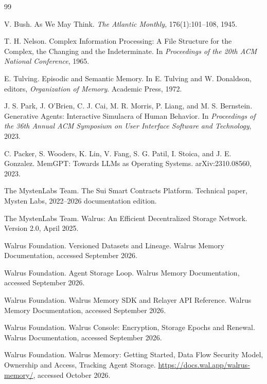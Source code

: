 \documentclass[11pt]{article}
\begin{document}
\begin{thebibliography}{99}

V. Bush.
\newblock As We May Think.
\newblock \emph{The Atlantic Monthly}, 176(1):101--108, 1945.

T. H. Nelson.
\newblock Complex Information Processing: A File Structure for the Complex, the Changing and the Indeterminate.
\newblock In \emph{Proceedings of the 20th ACM National Conference}, 1965.

E. Tulving.
\newblock Episodic and Semantic Memory.
\newblock In E. Tulving and W. Donaldson, editors, \emph{Organization of Memory}. Academic Press, 1972.

J. S. Park, J. O'Brien, C. J. Cai, M. R. Morris, P. Liang, and M. S. Bernstein.
\newblock Generative Agents: Interactive Simulacra of Human Behavior.
\newblock In \emph{Proceedings of the 36th Annual ACM Symposium on User Interface Software and Technology}, 2023.

C. Packer, S. Wooders, K. Lin, V. Fang, S. G. Patil, I. Stoica, and J. E. Gonzalez.
\newblock MemGPT: Towards LLMs as Operating Systems.
\newblock arXiv:2310.08560, 2023.

The MystenLabs Team.
\newblock The Sui Smart Contracts Platform.
\newblock Technical paper, Mysten Labs, 2022--2026 documentation edition.

The MystenLabs Team.
\newblock Walrus: An Efficient Decentralized Storage Network.
\newblock Version 2.0, April 2025.

Walrus Foundation.
\newblock Versioned Datasets and Lineage.
\newblock Walrus Memory Documentation, accessed September 2026.

Walrus Foundation.
\newblock Agent Storage Loop.
\newblock Walrus Memory Documentation, accessed September 2026.

Walrus Foundation.
\newblock Walrus Memory SDK and Relayer API Reference.
\newblock Walrus Memory Documentation, accessed September 2026.

Walrus Foundation.
\newblock Walrus Console: Encryption, Storage Epochs and Renewal.
\newblock Walrus Documentation, accessed September 2026.

Walrus Foundation.
\newblock Walrus Memory: Getting Started, Data Flow Security Model, Ownership and Access, Tracking Agent Storage.
\newblock \url{https://docs.wal.app/walrus-memory/}, accessed October 2026.


\end{thebibliography}
\end{document}
